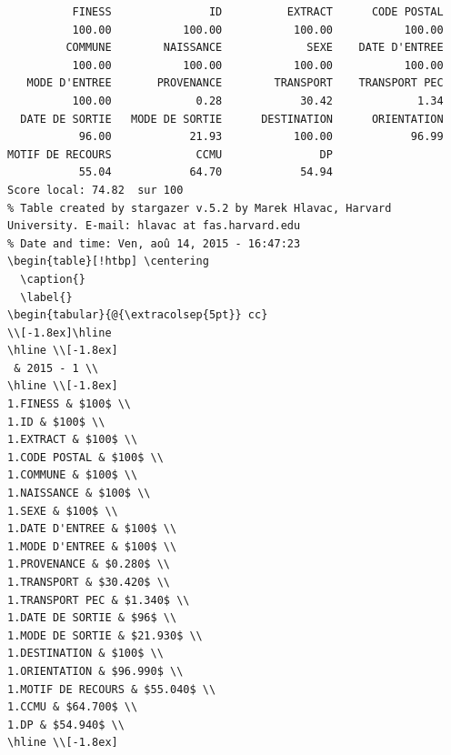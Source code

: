 \documentclass[]{article}
\begin{document}
\begin{verbatim}
          FINESS               ID          EXTRACT      CODE POSTAL 
          100.00           100.00           100.00           100.00 
         COMMUNE        NAISSANCE             SEXE    DATE D'ENTREE 
          100.00           100.00           100.00           100.00 
   MODE D'ENTREE       PROVENANCE        TRANSPORT    TRANSPORT PEC 
          100.00             0.28            30.42             1.34 
  DATE DE SORTIE   MODE DE SORTIE      DESTINATION      ORIENTATION 
           96.00            21.93           100.00            96.99 
MOTIF DE RECOURS             CCMU               DP 
           55.04            64.70            54.94 
Score local: 74.82  sur 100
% Table created by stargazer v.5.2 by Marek Hlavac, Harvard University. E-mail: hlavac at fas.harvard.edu
% Date and time: Ven, aoû 14, 2015 - 16:47:23
\begin{table}[!htbp] \centering 
  \caption{} 
  \label{} 
\begin{tabular}{@{\extracolsep{5pt}} cc} 
\\[-1.8ex]\hline 
\hline \\[-1.8ex] 
 & 2015 - 1 \\ 
\hline \\[-1.8ex] 
1.FINESS & $100$ \\ 
1.ID & $100$ \\ 
1.EXTRACT & $100$ \\ 
1.CODE POSTAL & $100$ \\ 
1.COMMUNE & $100$ \\ 
1.NAISSANCE & $100$ \\ 
1.SEXE & $100$ \\ 
1.DATE D'ENTREE & $100$ \\ 
1.MODE D'ENTREE & $100$ \\ 
1.PROVENANCE & $0.280$ \\ 
1.TRANSPORT & $30.420$ \\ 
1.TRANSPORT PEC & $1.340$ \\ 
1.DATE DE SORTIE & $96$ \\ 
1.MODE DE SORTIE & $21.930$ \\ 
1.DESTINATION & $100$ \\ 
1.ORIENTATION & $96.990$ \\ 
1.MOTIF DE RECOURS & $55.040$ \\ 
1.CCMU & $64.700$ \\ 
1.DP & $54.940$ \\ 
\hline \\[-1.8ex] 

\end{verbatim}
\end{document}
